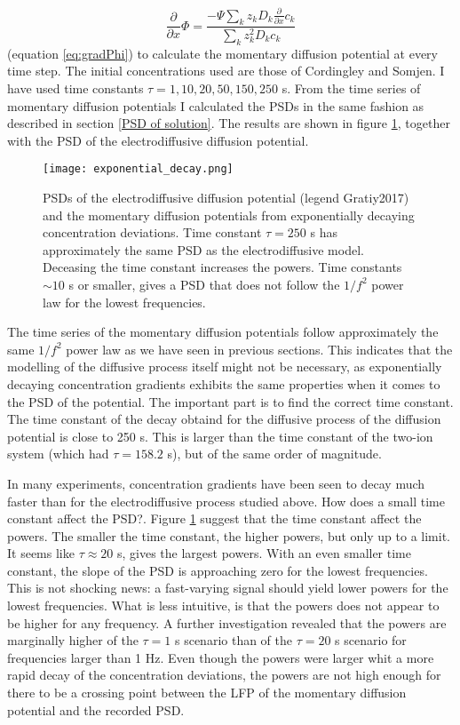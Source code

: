 \documentclass{article}
\begin{document}
\begin{equation*}
\frac{\partial}{\partial x} \Phi = \frac{-\Psi \sum_k z_k D_k \frac{\partial}{\partial x} c_k}{\sum_k z_k^2 D_k c_k}
\end{equation*}
(equation \ref{eq:gradPhi}) to calculate the momentary diffusion potential at every time step. The initial concentrations used are those of Cordingley and Somjen. I have used time constants $\tau = 1,10,20,50, 150, 250$ s. From the time series of momentary diffusion potentials I calculated the PSDs in the same fashion as described in section \ref{PSD of solution}. The results are shown in figure \ref{fig:exponential_decay}, together with the PSD of the electrodiffusive diffusion potential. 

\begin{figure}
  \texttt{[image: exponential\_decay.png]}
  \caption{PSDs of the electrodiffusive diffusion potential (legend Gratiy2017) and the momentary diffusion potentials from exponentially decaying concentration deviations. Time constant $\tau = 250$ s has approximately the same PSD as the electrodiffusive model. Deceasing the time constant increases the powers. Time constants $\sim 10$ s or smaller, gives a PSD that does not follow the $1/f^2$ power law for the lowest frequencies.}
  \label{fig:exponential_decay}
\end{figure}

The time series of the momentary diffusion potentials follow approximately the same $1/f^2$ power law as we have seen in previous sections. This indicates that the modelling of the diffusive process itself might not be necessary, as exponentially decaying concentration gradients exhibits the same properties when it comes to the PSD of the potential. The important part is to find the correct time constant. The time constant of the decay obtaind for the diffusive process of the diffusion potential is close to 250 s. This is larger than the time constant of the two-ion system (which had $\tau = 158.2$ s), but of the same order of magnitude.

In many experiments, concentration gradients have been seen to decay much faster than for the electrodiffusive process studied above. How does a small time constant affect the PSD?. Figure \ref{fig:exponential_decay} suggest that the time constant affect the powers. The smaller the time constant, the higher powers, but only up to a limit. It seems like $\tau \approx 20 $ s, gives the largest powers. With an even smaller time constant, the slope of the PSD is approaching zero for the lowest frequencies. This is not shocking news: a fast-varying signal should yield lower powers for the lowest frequencies. What is less intuitive, is that the powers does not appear to be higher for any frequency. A further investigation revealed that the powers are marginally higher of the $\tau = 1$ s scenario than of the $\tau = 20 $ s scenario for frequencies larger than 1 Hz.
Even though the powers were larger whit a more rapid decay of the concentration deviations, the powers are not high enough for there to be a crossing point between the LFP of the momentary diffusion potential and the recorded PSD. 
\end{document}
